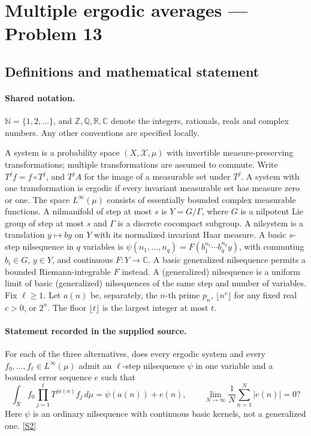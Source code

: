\documentclass[11pt]{article}
\newcommand{\sref}[2]{\hyperlink{source:#1:#2}{[S#2]}}
\begin{document}
\section{Multiple ergodic averages — Problem 13}\label{statement}

\subsection{Definitions and mathematical statement}

\paragraph{Shared notation.}$\mathbb N=\{1,2,\ldots\}$, and $\mathbb Z,\mathbb Q,\mathbb R,\mathbb C$ denote the integers, rationals, reals and complex numbers. Any other conventions are specified locally.


A system is a probability space $(X,\mathcal X,\mu)$ with invertible measure-preserving transformations; multiple transformations are assumed to commute. Write $T^j f=f\circ T^j$, and $T^j A$ for the image of a measurable set under $T^j$. A system with one transformation is ergodic if every invariant measurable set has measure zero or one. The space $L^\infty(\mu)$ consists of essentially bounded complex measurable functions. A nilmanifold of step at most $s$ is $Y=G/\Gamma$, where $G$ is a nilpotent Lie group of step at most $s$ and $\Gamma$ is a discrete cocompact subgroup. A nilsystem is a translation $y\mapsto by$ on $Y$ with its normalized invariant Haar measure. A basic $s$-step nilsequence in $q$ variables is $\psi(n_1,\ldots,n_q)=F(b_1^{n_1}\cdots b_q^{n_q}y)$, with commuting $b_i\in G$, $y\in Y$, and continuous $F:Y\to\mathbb C$. A basic generalized nilsequence permits a bounded Riemann-integrable $F$ instead. A (generalized) nilsequence is a uniform limit of basic (generalized) nilsequences of the same step and number of variables. Fix $\ell\ge1$. Let $a(n)$ be, separately, the $n$-th prime $p_n$, $\lfloor n^c\rfloor$ for any fixed real $c>0$, or $2^n$. The floor $\lfloor t\rfloor$ is the largest integer at most $t$.
\paragraph{Statement recorded in the supplied source.}
For each of the three alternatives, does every ergodic system and every $f_0,\ldots,f_\ell\in L^\infty(\mu)$ admit an $\ell$-step nilsequence $\psi$ in one variable and a bounded error sequence $e$ such that \[\int_X f_0\prod_{j=1}^\ell T^{ja(n)}f_j\,d\mu=\psi(a(n))+e(n),\qquad \lim_{N\to\infty}\frac1N\sum_{n=1}^N|e(n)|=0?\] Here $\psi$ is an ordinary nilsequence with continuous basic kernels, not a generalized one. \sref{statement}{2}
\end{document}
